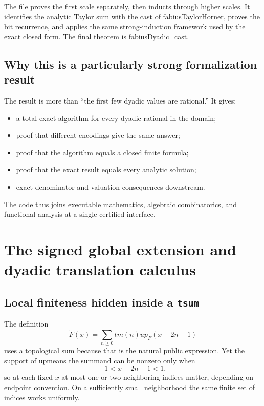 \documentclass[11pt,a4paper,openany]{book}
\def\decl#1{#1}
\def\upfun{up}
\def\TM{tm}
\newcommand{\upfun}{\ensuremath{\operatorname{up}}}
\newcommand{\TM}{\ensuremath{\operatorname{tm}}}
\newcommand{\decl}[1]{\texttt{\detokenize{#1}}}
\begin{document}
The file proves the first scale separately, then inducts through higher scales.
It identifies the analytic Taylor sum with the cast of
\decl{fabiusTaylorHorner}, proves the bit recurrence, and applies the same
strong-induction framework used by the exact closed form.  The final theorem is
\decl{fabiusDyadic_cast}.

\section{Why this is a particularly strong formalization result}
The result is more than “the first few dyadic values are rational.”  It gives:
\begin{itemize}
  \item a total exact algorithm for every dyadic rational in the domain;
  \item proof that different encodings give the same answer;
  \item proof that the algorithm equals a closed finite formula;
  \item proof that the exact result equals every analytic solution;
  \item exact denominator and valuation consequences downstream.
\end{itemize}
The code thus joins executable mathematics, algebraic combinatorics, and
functional analysis at a single certified interface.

\chapter{The signed global extension and dyadic translation calculus}
\label{ch:global}

\section{Local finiteness hidden inside a \texttt{tsum}}
The definition
\[
 \widetilde F(x)=\sum_{n\ge0}\TM(n)\upfun_F(x-2n-1)
\]
uses a topological sum because that is the natural public expression.  Yet the
support of \upfun means the summand can be nonzero only when
\[
 -1<x-2n-1<1,
\]
so at each fixed $x$ at most one or two neighboring indices matter, depending
on endpoint convention.  On a sufficiently small neighborhood the same finite
set of indices works uniformly.
\end{document}
